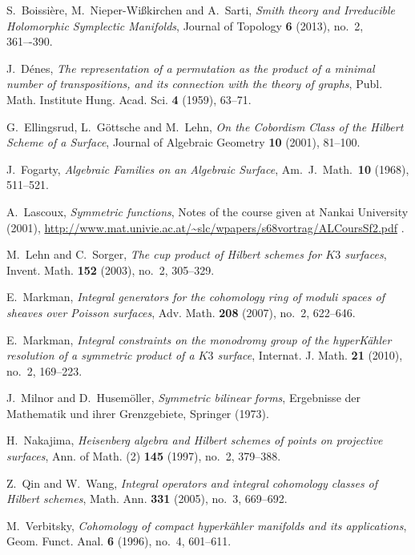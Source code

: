 \begin{thebibliography}{10}


S.~Boissi\`ere, M.~Nieper-Wi{\ss}kirchen and A.~Sarti, \emph{Smith theory and 
  Irreducible Holomorphic Symplectic Manifolds}, Journal of Topology \textbf{6} (2013), no.~2, 361–-390.

J.~D\'enes, \emph{The representation of a permutation as the product of a minimal number of
  transpositions, and its connection with the theory of graphs}, Publ. Math. Institute Hung. Acad. Sci.
  \textbf{4} (1959), 63--71.

G.~Ellingsrud, L.~G\"ottsche and M.~Lehn, \emph{On the Cobordism Class of the Hilbert 
  Scheme of a Surface}, Journal of Algebraic Geometry \textbf{10} (2001), 81--100. 

J.~Fogarty, \emph{Algebraic Families on an Algebraic Surface},
  Am.~J.~Math.~\textbf{10} (1968), 511--521.

A.~Lascoux, \emph{Symmetric functions}, Notes of the course given at Nankai University (2001),
  \href{http://www.mat.univie.ac.at/~slc/wpapers/s68vortrag/ALCoursSf2.pdf}{http://www.mat.univie.ac.at/\~{}slc/wpapers/s68vortrag/ALCoursSf2.pdf} .

M.~Lehn and C.~Sorger, \emph{The cup product of {H}ilbert schemes for {$K3$}
  surfaces}, Invent. Math. \textbf{152} (2003), no.~2, 305--329.

E.~Markman, \emph{Integral generators for the cohomology ring of moduli spaces of
  sheaves over {P}oisson surfaces}, Adv. Math. \textbf{208} (2007), no.~2,
  622--646.

E.~Markman, \emph{Integral constraints on the monodromy group of the
  hyper{K}\"ahler resolution of a symmetric product of a {$K3$} surface},
  Internat. J. Math. \textbf{21} (2010), no.~2, 169--223.

J.~Milnor and D.~Husem{\"o}ller, \emph{Symmetric bilinear forms}, 
  Ergebnisse der Mathematik und ihrer Grenzgebiete, Springer (1973).

H.~Nakajima, \emph{Heisenberg algebra and Hilbert schemes of points on
  projective surfaces}, Ann. of Math. (2) \textbf{145} (1997), no.~2, 379--388.

Z.~Qin and W.~Wang, \emph{Integral operators and integral cohomology classes of
  Hilbert schemes}, Math. Ann. \textbf{331} (2005), no.~3, 669--692.

M.~Verbitsky, \emph{Cohomology of compact hyperk\"ahler manifolds and its
  applications}, Geom. Funct. Anal. \textbf{6} (1996), no.~4, 601--611.

\end{thebibliography}